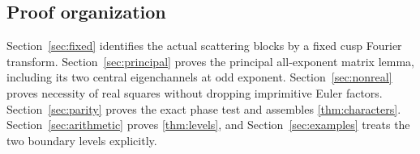 \subsection{Proof organization}

Section~\ref{sec:fixed} identifies the actual scattering blocks by a
fixed cusp Fourier transform. Section~\ref{sec:principal} proves the
principal all-exponent matrix lemma, including its two central
eigenchannels at odd exponent. Section~\ref{sec:nonreal} proves
necessity of real squares without dropping imprimitive Euler factors.
Section~\ref{sec:parity} proves the exact phase test and assembles
\cref{thm:characters}. Section~\ref{sec:arithmetic} proves
\cref{thm:levels}, and Section~\ref{sec:examples} treats the two
boundary levels explicitly.
